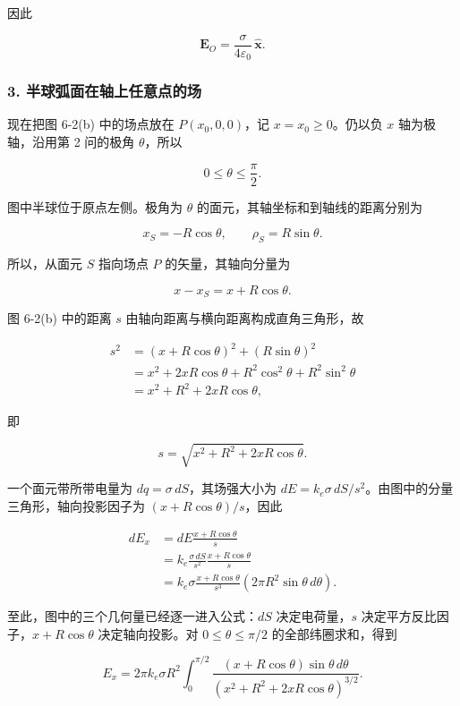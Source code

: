 \documentclass[12pt,a4paper,UTF8]{ctexart}
\begin{document}
因此

\[
\boxed{
\bm E_O=\frac{\sigma}{4\varepsilon_0}\,\hat{\bm x}
}.
\]

\subsubsection{3.
半球弧面在轴上任意点的场}\label{ux534aux7403ux5f27ux9762ux5728ux8f74ux4e0aux4efbux610fux70b9ux7684ux573a}

现在把图 6-2(b) 中的场点放在 \(P(x_0,0,0)\)，记 \(x=x_0\ge0\)。仍以负
\(x\) 轴为极轴，沿用第 2 问的极角 \(\theta\)，所以

\[
0\le\theta\le\frac{\pi}{2}.
\]

图中半球位于原点左侧。极角为 \(\theta\)
的面元，其轴坐标和到轴线的距离分别为

\[
x_S=-R\cos\theta,
\qquad
\rho_S=R\sin\theta.
\]

所以，从面元 \(S\) 指向场点 \(P\) 的矢量，其轴向分量为

\[
x-x_S=x+R\cos\theta.
\]

图 6-2(b) 中的距离 \(s\) 由轴向距离与横向距离构成直角三角形，故

\[
\begin{aligned}
s^2
&=(x+R\cos\theta)^2+(R\sin\theta)^2\\
&=x^2+2xR\cos\theta+R^2\cos^2\theta+R^2\sin^2\theta\\
&=x^2+R^2+2xR\cos\theta,
\end{aligned}
\]

即

\[
s=\sqrt{x^2+R^2+2xR\cos\theta}.
\]

一个面元带所带电量为 \(dq=\sigma\,dS\)，其场强大小为
\(dE=k_e\sigma\,dS/s^2\)。由图中的分量三角形，轴向投影因子为
\((x+R\cos\theta)/s\)，因此

\[
\begin{aligned}
dE_x
&=dE\frac{x+R\cos\theta}{s}\\
&=k_e\frac{\sigma\,dS}{s^2}
\frac{x+R\cos\theta}{s}\\
&=k_e\sigma\frac{x+R\cos\theta}{s^3}
\left(2\pi R^2\sin\theta\,d\theta\right).
\end{aligned}
\]

至此，图中的三个几何量已经逐一进入公式：\(dS\) 决定电荷量，\(s\)
决定平方反比因子，\(x+R\cos\theta\) 决定轴向投影。对
\(0\le\theta\le\pi/2\) 的全部纬圈求和，得到

\[
E_x=2\pi k_e\sigma R^2
\int_0^{\pi/2}
\frac{(x+R\cos\theta)\sin\theta\,d\theta}
{(x^2+R^2+2xR\cos\theta)^{3/2}}.
\]
\end{document}
